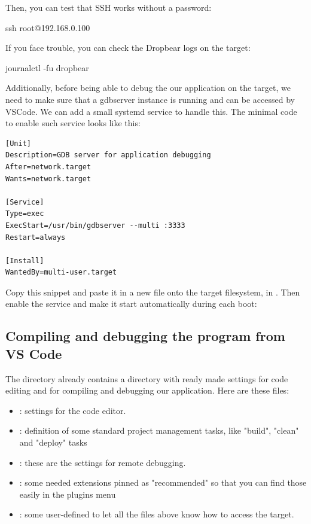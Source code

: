 Then, you can test that SSH works without a password:

\begin{bashinput}
ssh root@192.168.0.100
\end{bashinput}

If you face trouble, you can check the Dropbear logs on the target:

\begin{bashinput}
journalctl -fu dropbear
\end{bashinput}

Additionally, before being able to debug the our application on the target, we
need to make sure that a gdbserver instance is running and can be accessed
by VSCode. We can add a small systemd service to handle this. The minimal
code to enable such service looks like this:
\begin{verbatim}
[Unit]
Description=GDB server for application debugging
After=network.target
Wants=network.target

[Service]
Type=exec
ExecStart=/usr/bin/gdbserver --multi :3333
Restart=always

[Install]
WantedBy=multi-user.target
\end{verbatim}
Copy this snippet and paste it in a new  file onto
the target filesystem, in . Then enable the
service and make it start automatically during each boot:


\subsection{Compiling and debugging the program from VS Code}

The  directory already contains a  directory
with ready made settings for code editing and for compiling and debugging
our application. Here are these files:

\begin{itemize}
	\item {}: settings for the code editor.
	\item {}: definition of some standard project
		management tasks, like "build", "clean" and "deploy" tasks
	\item {}: these are the settings for remote
		debugging.
	\item {}: some needed extensions pinned as
		"recommended" so that you can find those easily in the plugins
		menu
	\item {}: some user-defined to let all the files above know how
		to access the target.
\end{itemize}

